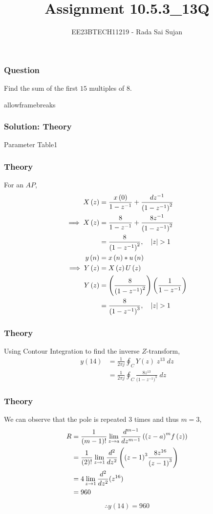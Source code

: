 \documentclass{beamer}
\begin{document}
\title{Assignment 10.5.3\_13Q}
\author{EE23BTECH11219 - Rada Sai Sujan$^{}$%
}
\frame{\titlepage}

\begin{frame}
\frametitle{Question}
Find the sum of the first $15$ multiples of $8$. \\
\end{frame}

\begin{frame}{allowframebreaks}
\frametitle{Solution: Theory}
\begin{table}[ht]
    \centering
    \def\arraystretch{1.5}
    
    \caption{Parameter Table1}
    \label{tab:10.5.3.1}
\end{table}
\end{frame}

\begin{frame}
\frametitle{Theory}
For an $AP$,
\begin{align}
    X\left(z\right) &= \frac{ x\left(0\right) }{1-z^{-1}} + \frac{dz^{-1}}{{(1-z^{-1})}^{2}}    \\
    \implies X\left(z\right) &= \frac{8}{1-z^{-1}} + \frac{8z^{-1}}{{(1-z^{-1})}^{2}} \\
    &= \frac{8}{({1-z^{-1})}^{2}} ,\quad \left\vert z\right\vert>1    \\
    y\left(n\right)&=x\left(n\right)\ast u\left(n\right)\\
    \implies Y\left(z\right)&=X\left(z\right)U\left(z\right)   \\
    Y\left(z\right)&=\left(\frac{8}{({1-z^{-1})}^{2}}\right)\left(\frac{1}{1-z^{-1}}\right)  \\
    &=\frac{8}{({1-z^{-1})}^{3}} ,\quad \left\vert z\right\vert>1 
\end{align}
\end{frame}

\begin{frame}
\frametitle{Theory}
 Using Contour Integration to find the inverse $Z$-transform,
\begin{align}
    y(14)&=\frac{1}{2\pi j}\oint_{C}Y(z) \;z^{13} \;dz  \\
    &=\frac{1}{2\pi j}\oint_{C}\frac{8z^{13}}{({1-z^{-1})}^{3}} \;dz 
\end{align}
\end{frame}

\begin{frame}
\frametitle{Theory}
We can observe that the pole is repeated $3$ times and thus $m=3$,
\begin{align}
    R&=\frac{1}{\left(m-1\right)!}\lim\limits_{z\to a}\frac{d^{m-1}}{dz^{m-1}}\left({(z-a)}^{m}f\left(z\right)\right)  \\
    &=\frac{1}{\left(2\right)!}\lim\limits_{z\to 1}\frac{d^{2}}{dz^{2}}\left({(z-1)}^{3}\frac{8z^{16}}{{(z-1)}^3}\right)   \\
    &=4\lim\limits_{z\to 1}\frac{d^2}{dz^2}(z^{16})   \\
    &=960
\end{align}
\begin{align}
    \therefore \boxed{y(14)=960}
\end{align}
\end{frame}
\end{document}
